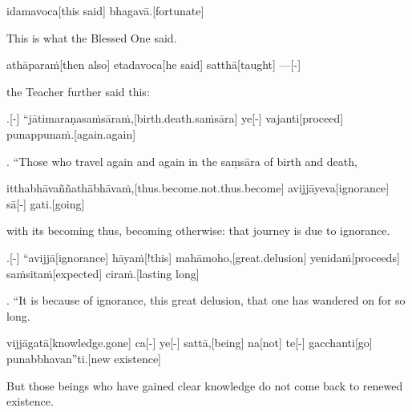 \begin{samepage}
\begingl[glneveryline={\PaliGlossA,\PaliGlossB}]
idamavoca[this said] bhagavā.[fortunate]
\endgl
\nopagebreak
\linespread{0.5}
\begin{spacin}{0.2}
{\PaliGlossFT This is what the Blessed One said.}
\end{spacin}
\vskip 12pt
\end{samepage}
\begin{samepage}
\begingl[glneveryline={\PaliGlossA,\PaliGlossB}]
athāparaṁ[then also] etadavoca[he said] satthā[taught] —[-]
\endgl
\nopagebreak
\linespread{0.5}
\begin{spacin}{0.2}
{\PaliGlossFT the Teacher further said this:}
\end{spacin}
\vskip 12pt
\end{samepage}
\vskip 0.2in
\begin{samepage}
.[-] “jātimaraṇasaṁsāraṁ,[birth.death.saṁsāra] ye[-] vajanti[proceed] punappunaṁ.[again.again]
\endgl
\nopagebreak
\linespread{0.5}
\begin{spacin}{0.2}
{. “Those who travel again and again in the saṃsāra of birth and death,}
\end{spacin}
\vskip 12pt
\end{samepage}
\begin{samepage}
\begingl[glneveryline={\PaliGlossA,\PaliGlossB}]
itthabhāvaññathābhāvaṁ,[thus.become.not.thus.become] avijjāyeva[ignorance] sā[-] gati.[going]
\endgl
\nopagebreak
\linespread{0.5}
\begin{spacin}{0.2}
{\PaliGlossFT with its becoming thus, becoming otherwise:  that journey is due to ignorance.}
\end{spacin}
\vskip 12pt
\end{samepage}
\begin{samepage}
.[-] “avijjā[ignorance] hāyaṁ[!this] mahāmoho,[great.delusion] yenidaṁ[proceeds] saṁsitaṁ[expected] ciraṁ.[lasting long]
\endgl
\nopagebreak
\linespread{0.5}
\begin{spacin}{0.2}
{. “It is because of ignorance, this great delusion,  that one has wandered on for so long.}
\end{spacin}
\vskip 12pt
\end{samepage}
\begin{samepage}
\begingl[glneveryline={\PaliGlossA,\PaliGlossB}]
vijjāgatā[knowledge.gone] ca[-] ye[-] sattā,[being] na[not] te[-] gacchanti[go] punabbhavan”ti.[new existence]
\endgl
\nopagebreak
\linespread{0.5}
\begin{spacin}{0.2}
{\PaliGlossFT But those beings who have gained clear knowledge do not come back to renewed existence.}
\end{spacin}
\vskip 12pt
\end{samepage}
